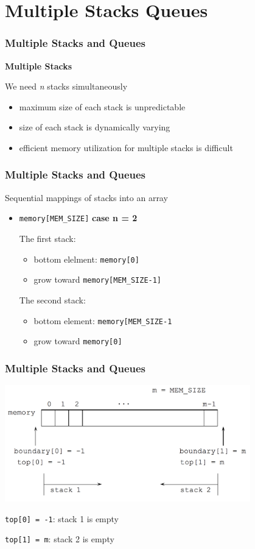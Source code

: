 \documentclass[newPxFont,sthlmFooter,nooffset]{beamer}
\begin{document}
\section{Multiple Stacks Queues} 
\begin{frame}[t]
  \frametitle{Multiple Stacks and Queues}
\textbf{Multiple Stacks}

We need \textit{n} stacks simultaneously
\begin{itemize}
\item maximum size of each stack is unpredictable
\item size of each stack is dynamically varying
\item efficient memory utilization for multiple stacks is difficult
\end{itemize}
\end{frame}


\begin{frame}[t]
  \frametitle{Multiple Stacks and Queues}
Sequential mappings of stacks into an array
\begin{itemize}
\item \texttt{memory[MEM\_SIZE]}
\bigskip
\textbf{case n = 2}

The first stack:
\begin{itemize}
\item bottom elelment: \texttt{memory[0]}
\item grow toward \texttt{memory[MEM\_SIZE-1]}
\end{itemize}

The second stack:
\begin{itemize}
\item bottom element: \texttt{memory[MEM\_SIZE-1}
\item grow toward \texttt{memory[0]}
\end{itemize}
\end{itemize}

\end{frame}

\begin{frame}[t]
  \frametitle{Multiple Stacks and Queues}
  \begin{center}
    \includegraphics[width=0.8\textwidth]{figures/fig08_mulstack.png}
  \end{center}

\texttt{top[0] = -1}: stack 1 is empty

\texttt{top[1] = m}: stack 2 is empty
\end{frame}
\end{document}

